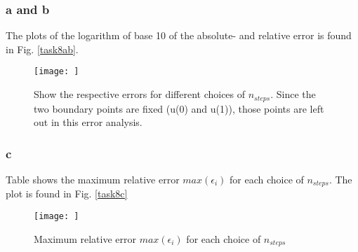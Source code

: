 \subsubsection{a and b}

The plots of the logarithm of base 10 of the absolute- and relative error is found in Fig. \ref{task8ab}. 

\begin{figure}
    \centering
    \texttt{[image: ]}
    \caption{Show the respective errors for different choices of $n_{steps}$. Since the two boundary points are fixed (u(0) and u(1)), those points are left out in this error analysis.}
    \label{fig:task8ab}
\end{figure}


\subsubsection{c}
Table    shows the maximum relative error $max(\epsilon_i)$ for each choice of $n_{steps}$. The plot is found in Fig. \ref{task8c} 

\begin{figure}
    \centering
    \texttt{[image: ]}
    \caption{Maximum relative error $max(\epsilon_i)$ for each choice of $n_{steps}$}
    \label{fig:task8c}
\end{figure}

